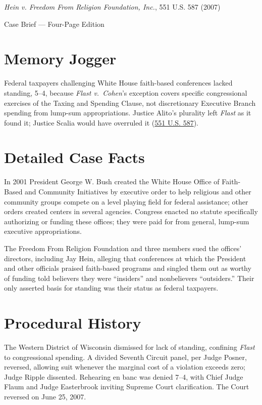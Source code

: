 \documentclass[12pt]{article}
\begin{document}
\begin{center}
{\LARGE \textit{Hein v. Freedom From Religion Foundation, Inc.}, 551 U.S. 587 (2007)\par}
\vspace{0.8em}
{\large Case Brief --- Four-Page Edition\par}
\end{center}
\vspace{1em}

\section{Memory Jogger}

Federal taxpayers challenging White House faith-based conferences lacked standing, 5--4, because \textit{Flast v.\ Cohen}'s exception covers specific congressional exercises of the Taxing and Spending Clause, not discretionary Executive Branch spending from lump-sum appropriations. Justice Alito's plurality left \textit{Flast} as it found it; Justice Scalia would have overruled it (\href{https://supreme.justia.com/cases/federal/us/551/587/}{551 U.S. 587}).

\section{Detailed Case Facts}

In 2001 President George W. Bush created the White House Office of Faith-Based and Community Initiatives by executive order to help religious and other community groups compete on a level playing field for federal assistance; other orders created centers in several agencies. Congress enacted no statute specifically authorizing or funding these offices; they were paid for from general, lump-sum executive appropriations.

The Freedom From Religion Foundation and three members sued the offices' directors, including Jay Hein, alleging that conferences at which the President and other officials praised faith-based programs and singled them out as worthy of funding told believers they were ``insiders'' and nonbelievers ``outsiders.'' Their only asserted basis for standing was their status as federal taxpayers.

\section{Procedural History}

The Western District of Wisconsin dismissed for lack of standing, confining \textit{Flast} to congressional spending. A divided Seventh Circuit panel, per Judge Posner, reversed, allowing suit whenever the marginal cost of a violation exceeds zero; Judge Ripple dissented. Rehearing en banc was denied 7--4, with Chief Judge Flaum and Judge Easterbrook inviting Supreme Court clarification. The Court reversed on June 25, 2007.
\end{document}

